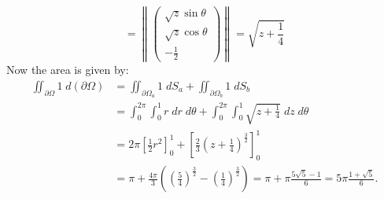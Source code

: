 \documentclass[11pt]{article}
\begin{document}
\begin{solution}
\[        = 
        \left\|\begin{pmatrix} \sqrt{z}\sin\theta \\ \sqrt{z}\cos\theta\\-\frac{1}{2} \end{pmatrix}\right\| 
        = 
        \sqrt{z+\frac{1}{4}}
    \]
    Now the area is given by:
    \begin{align*}
        \iint_{\partial\Omega} 1 \;d (\partial \Omega)
        &
        =
        \iint_{\partial\Omega_a} 1 \;dS_a + 	\iint_{\partial\Omega_b} 1 \;dS_b
        \\&
        = \int_0^{2\pi} \int_0^1 r \;d r\;d\theta + \int_0^{2\pi} \int_0^1\sqrt{z+\frac{1}{4}}\;d z \;d \theta
        \\&
        = 
        2\pi\left[\frac{1}{2}r^2\right]_0^1 + \left[\frac{2}{3}\left(z+\frac{1}{4}\right)^{\frac{3}{2}}\right]_0^1
        \\&
        = 
        \pi + \frac{4\pi}{3}\left(\left(\frac{5}{4}\right)^{\frac{3}{2}} - \left(\frac{1}{4}\right)^{\frac{3}{2}}\right)
        = 
        \pi + \pi \frac{5\sqrt{5} - 1}{6}
        = 
        5\pi \frac{1 + \sqrt{5}}{6}
        .
    \end{align*}
\end{solution}
\end{document}
